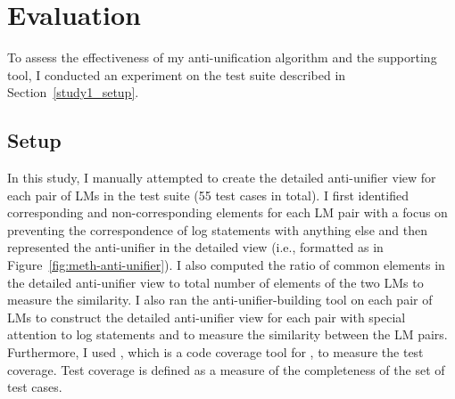 
\section{Evaluation} \label{anti-unifier-assessment}
To assess the effectiveness of my anti-unification algorithm and the supporting tool, I conducted an experiment on the test suite described in Section~\ref{study1_setup}. %


\subsection{Setup}  \label{study2-setup}
In this study, I manually attempted to create the detailed anti-unifier view for each pair of LMs in the test suite (55 test cases in total). I first identified corresponding and non-corresponding  elements for each LM pair with a focus on preventing the correspondence of log statements with anything else and then represented the anti-unifier in the detailed view (i.e., formatted as in Figure~\ref{fig:meth-anti-unifier}). I also computed the ratio of common  elements in the detailed anti-unifier view to total number of  elements of the two LMs to measure the similarity.
I also ran the anti-unifier-building tool on each pair of LMs to construct the detailed anti-unifier view for each pair with special attention to log statements and to measure the similarity between the LM pairs. Furthermore, I used , which is a  code coverage tool for , to measure the test coverage. Test coverage is defined as a measure of the completeness of the set of test cases.


